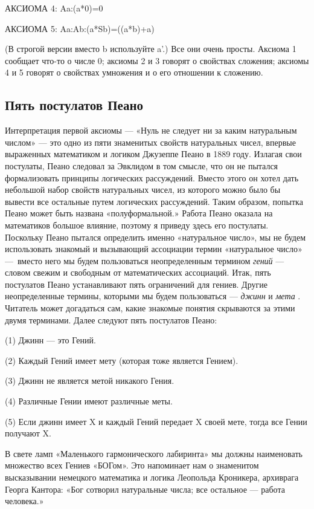 \documentclass[../main.tex]{subfiles}
\begin{document}
АКСИОМА 4: Aa:(a*0)=0

АКСИОМА 5: Aa:Ab:(a*Sb)=((a*b)+a)

(В строгой версии вместо b используйте a'.) Все они очень просты. Аксиома 1 сообщает что-то о числе 0; аксиомы 2 и 3 говорят о свойствах сложения; аксиомы 4 и 5 говорят о свойствах умножения и о его отношении к сложению.


\subsection{Пять постулатов Пеано}

Интерпретация первой аксиомы --- «Нуль не следует ни за каким натуральным числом» --- это одно из пяти знаменитых свойств натуральных чисел, впервые выраженных математиком и логиком Джузеппе Пеано в 1889 году. Излагая свои постулаты, Пеано следовал за Эвклидом в том смысле, что он не пытался формализовать принципы логических рассуждений. Вместо этого он хотел дать небольшой набор свойств натуральных чисел, из которого можно было бы вывести все остальные путем логических рассуждений. Таким образом, попытка Пеано может быть названа «полуформальной.» Работа Пеано оказала на математиков большое влияние, поэтому я приведу здесь его постулаты. Поскольку Пеано пытался определить именно «натуральное число», мы не будем использовать знакомый и вызывающий ассоциации термин «натуральное число» ---~вместо него мы будем пользоваться неопределенным термином \emph{гений} --- словом свежим и свободным от математических ассоциаций. Итак, пять постулатов Пеано устанавливают пять ограничений для гениев. Другие неопределенные термины, которыми мы будем пользоваться --- \emph{джинн} и \emph{мета} . Читатель может догадаться сам, какие знакомые понятия скрываются за этими двумя терминами. Далее следуют пять постулатов Пеано:

(1) Джинн --- это Гений.

(2) Каждый Гений имеет мету (которая тоже является Гением).

(3) Джинн не является метой никакого Гения.

(4) Различные Гении имеют различные меты.

(5) Если джинн имеет X и каждый Гений передает X своей мете, тогда все Гении получают X.

В свете ламп «Маленького гармонического лабиринта» мы должны наименовать множество всех Гениев «БОГом». Это напоминает нам о знаменитом высказывании немецкого математика и логика Леопольда Кроникера, архиврага Георга Кантора: «Бог сотворил натуральные числа; все остальное --- работа человека.»
\end{document}
